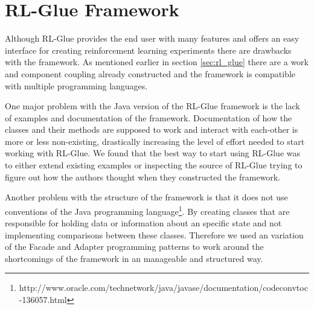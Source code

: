 \section{RL-Glue Framework}
\label{ap:eval_glue}
Although RL-Glue provides the end user with many features and offers an easy interface for creating reinforcement learning experiments there are drawbacks with the framework. As mentioned earlier in section \ref{sec:rl_glue} there are a work and component coupling already constructed and the framework is compatible with multiple programming languages.

One major problem with the Java version of the RL-Glue framework is the lack of examples and documentation of the framework. Documentation of how the classes and their methods are supposed to work and interact with each-other is more or less non-existing, drastically increasing the level of effort needed to start  working with RL-Glue. We found that the best way to start using RL-Glue was to either extend existing examples or inspecting the source of RL-Glue trying to figure out how the authors thought when they constructed the framework.

Another problem with the structure of the framework is that it does not use conventions of the Java programming language\footnote{http://www.oracle.com/technetwork/java/javase/documentation/codeconvtoc-136057.html}. By creating classes that are responsible for holding data or information about an specific state and not implementing comparisons between these classes. Therefore we used an variation of the Facade and Adapter programming patterns \parencite{gamme1994designpatterns} to work around the shortcomings of the framework in an manageable and structured way.